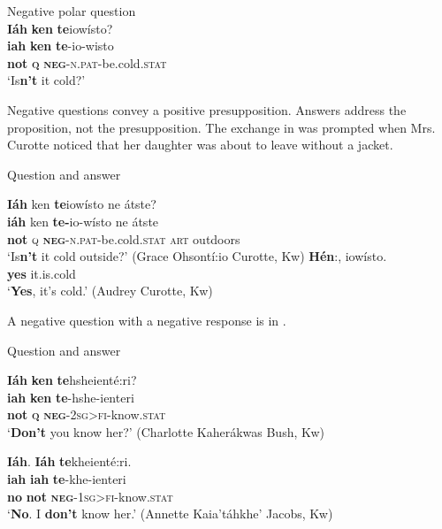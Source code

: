 \documentclass[output=paper,colorlinks,citecolor=brown]{langscibook}
\begin{document}
\ea\label{ex:moh:36}Negative polar question\\
    \glll \textbf{Iáh} \textbf{ken} \textbf{te}iowísto? \\
         \textbf{iah} \textbf{ken} \textbf{te}-io-wisto\\
         \textbf{not} \textbf{\textsc{q}} \textsc{\textbf{neg}-n.pat}-be.cold.\textsc{stat}\\
    \glt ‘Is\textbf{n’t} it cold?’
\z

Negative questions convey a positive presupposition. Answers address the proposition, not the presupposition. The exchange in  was prompted when Mrs. Curotte noticed that her daughter was about to leave without a jacket.

\ea\label{ex:moh:37}Question and answer\\ 
\begin{xlist}[GOC:]
     \label{ex:moh:37a}
    	\glll \textbf{Iáh} ken \textbf{te}iowísto ne átste?\\
             \textbf{iáh} ken \textbf{te-}io-wísto ne átste\\ 
             \textbf{not} \textsc{q} \textbf{\textsc{neg}}-\textsc{n.pat}-be.cold.\textsc{stat} \textsc{art} outdoors\\
        \glt ‘Is\textbf{n’t} it cold outside?’ (Grace Ohsontí:io Curotte, Kw)
    \label{ex:moh:37b}
    	\gll \textbf{Hén}:, iowísto.\\
             \textbf{yes} {it.is.cold} \\
        \glt ‘\textbf{Yes}, it’s cold.’ (Audrey Curotte, Kw)\\ 
\end{xlist}
\z

A negative question with a negative response is in .

\ea\label{ex:moh:38} Question and answer\\
\begin{xlist}[CKB:]
    \label{ex:moh:38a}
        \glll \textbf{Iáh} \textbf{ken} \textbf{te}hsheienté:ri? \\
             \textbf{iah} \textbf{ken} \textbf{te}-hshe-ienteri \\
             \textbf{not} \textbf{\textsc{q}} \textsc{\textbf{neg}-2sg>fi}-know.\textsc{stat} \\
        \glt ‘\textbf{Don’t} you know her?’ (Charlotte Kaherákwas Bush, Kw)
    
    \label{ex:moh:38b}
        \glll \textbf{Iáh}. \textbf{Iáh} \textbf{te}kheienté:ri. \\
             \textbf{iah} \textbf{iah} \textbf{te}-khe-ienteri\\
             \textbf{no} \textbf{not} \textsc{\textbf{neg}-1sg>fi}-know.\textsc{stat}\\
        \glt ‘\textbf{No}. I \textbf{don’t} know her.’ (Annette Kaia’táhkhe’ Jacobs, Kw)
\end{xlist}
\z 
\end{document}
